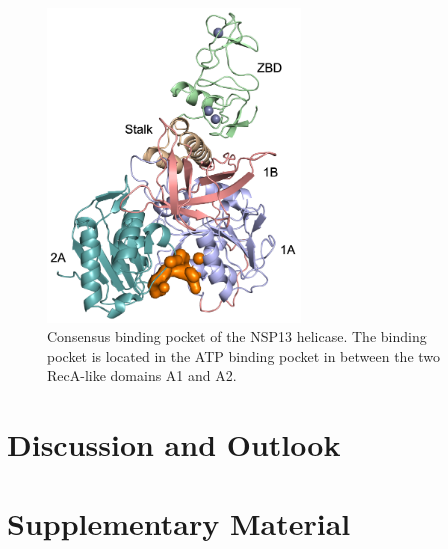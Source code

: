 \documentclass[11pt, letterpaper, titlepage]{article}
\begin{document}
\begin{figure}
    \centering
    \includegraphics[width=0.6\textwidth]{consens_domain_big.pdf}
    \caption{Consensus binding pocket of the NSP13 helicase. The binding pocket is located in the ATP binding pocket in between the two RecA-like domains A1 and A2.}
    \label{consensus_binding_pocket}
\end{figure}

\FloatBarrier

\section{Discussion and Outlook}

\section{Supplementary Material}

\pagebreak
\FloatBarrier

\renewcommand{\bibname}{References}  %
\printbibliography
\end{document}
